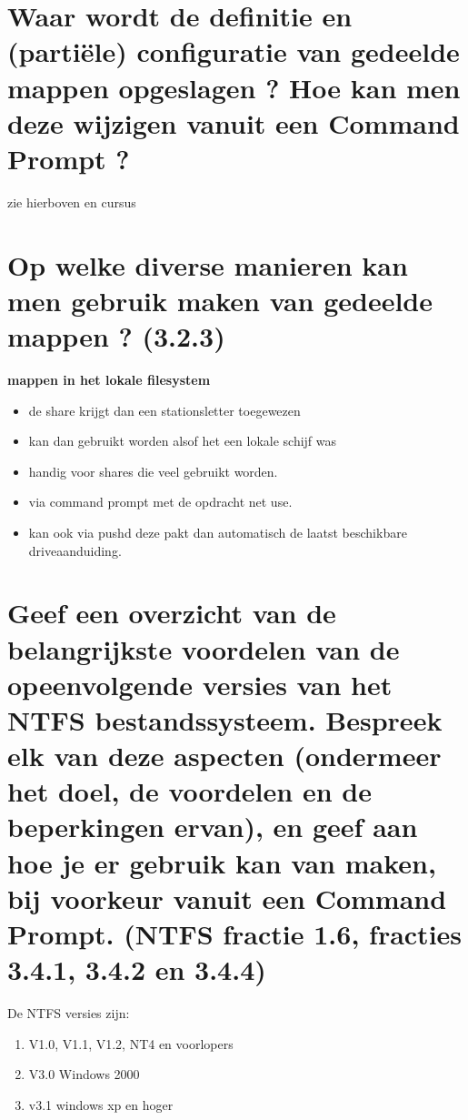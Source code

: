\begin{itemize}
\end{itemize}

\section{Waar wordt de definitie en (parti\"ele) configuratie van gedeelde mappen opgeslagen ? Hoe kan men deze wijzigen vanuit een Command Prompt ?}
zie hierboven en cursus

\section{Op welke diverse manieren kan men gebruik maken van gedeelde mappen ? (3.2.3)}
\textbf{mappen in het lokale filesystem}
\begin{itemize}
\item  de share krijgt dan een stationsletter toegewezen 
\item kan dan gebruikt worden alsof het een lokale schijf was
\item handig voor shares die veel gebruikt worden. 
\item via command prompt met de opdracht net use.
\item kan ook via pushd deze pakt dan automatisch de laatst beschikbare driveaanduiding.
\end{itemize}

\section{Geef een overzicht van de belangrijkste voordelen van de opeenvolgende versies van het NTFS bestandssysteem. Bespreek elk van deze aspecten (ondermeer het doel, de voordelen en de beperkingen ervan), en geef aan hoe je er gebruik kan van maken, bij voorkeur vanuit een Command Prompt. (NTFS fractie 1.6, fracties 3.4.1, 3.4.2 en 3.4.4)}

De NTFS versies zijn:
\begin{enumerate}
\item V1.0, V1.1, V1.2, NT4 en voorlopers
\item V3.0 Windows 2000
\item v3.1 windows xp en hoger
\end{enumerate}


